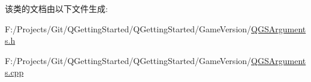 该类的文档由以下文件生成\+:\begin{DoxyCompactItemize}
\item 
F\+:/\+Projects/\+Git/\+Q\+Getting\+Started/\+Q\+Getting\+Started/\+Game\+Version/\mbox{\hyperlink{_q_g_s_arguments_8h}{Q\+G\+S\+Arguments.\+h}}\item 
F\+:/\+Projects/\+Git/\+Q\+Getting\+Started/\+Q\+Getting\+Started/\+Game\+Version/\mbox{\hyperlink{_q_g_s_arguments_8cpp}{Q\+G\+S\+Arguments.\+cpp}}\end{DoxyCompactItemize}
